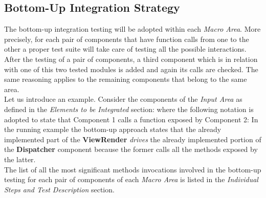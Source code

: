 \documentclass[11pt,a4paper]{report}
\begin{document}
\subsection{Bottom-Up Integration Strategy}
The bottom-up integration testing will be adopted within each \textit{Macro Area}. More precisely, for each pair of components that have function calls from one to the other a proper test suite will take care of testing all the possible interactions. After the testing of a pair of components, a third component which is in relation with one of this two tested modules is added and again its calls are checked. The same reasoning applies to the remaining components that belong to the same area.\\Let us introduce an example. Consider the components of the \textit{Input Area} as defined in the \textit{Elements to be Integrated} section: 
\noindent where the following notation is adopted to state that Component 1 calls a function exposed by Component 2:
\noindent In the running example the bottom-up approach states that the already implemented part of the \textbf{ViewRender} \textit{drives} the already implemented portion of the \textbf{Dispatcher} component because the former calls all the methods exposed by the latter.\\The list of all the most significant methods invocations involved in the bottom-up testing for each pair of components of each \textit{Macro Area} is listed  in the \textit{Individual Steps and Test Description} section.
\end{document}

